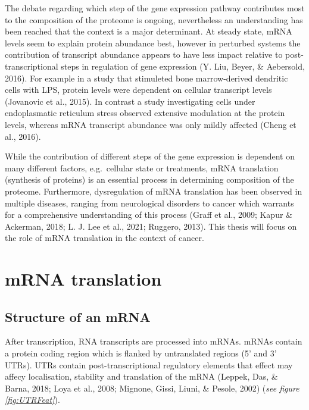 \documentclass[12pt,openany]{book}
\begin{document}
The debate regarding which step of the gene expression pathway
contributes most to the composition of the proteome is ongoing,
nevertheless an understanding has been reached that the context is a
major determinant. At steady state, mRNA levels seem to explain protein
abundance best, however in perturbed systems the contribution of
transcript abundance appears to have less impact relative to
post-transcriptional steps in regulation of gene expression (Y. Liu,
Beyer, \& Aebersold, 2016). For example in a study that stimuleted bone
marrow-derived dendritic cells with LPS, protein levels were dependent
on cellular transcript levels (Jovanovic et al., 2015). In contrast a
study investigating cells under endoplasmatic reticulum stress observed
extensive modulation at the protein levels, whereas mRNA transcript
abundance was only mildly affected (Cheng et al., 2016).

While the contribution of different steps of the gene expression is
dependent on many different factors, e.g.~cellular state or treatments,
mRNA translation (synthesis of proteins) is an essential process in
determining composition of the proteome. Furthermore, dysregulation of
mRNA translation has been observed in multiple diseases, ranging from
neurological disorders to cancer which warrants for a comprehensive
understanding of this process (Graff et al., 2009; Kapur \& Ackerman,
2018; L. J. Lee et al., 2021; Ruggero, 2013). This thesis will focus on
the role of mRNA translation in the context of cancer. \newline
\section{mRNA translation} \subsection{Structure of an mRNA} After
transcription, RNA transcripts are processed into mRNAs. mRNAs contain a
protein coding region which is flanked by untranslated regions (5' and
3' UTRs). UTRs contain post-transcriptional regulatory elements that
effect may affecy localisation, stability and translation of the mRNA
(Leppek, Das, \& Barna, 2018; Loya et al., 2008; Mignone, Gissi, Liuni,
\& Pesole, 2002) (\emph{see figure \ref{fig:UTRFeat}}).
\end{document}

